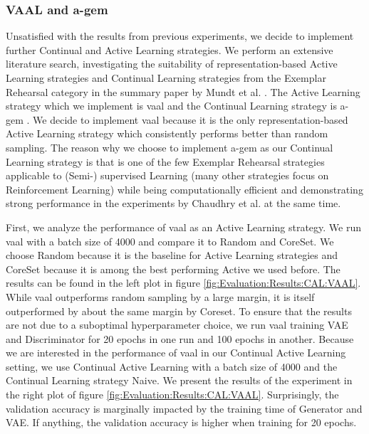 \subsubsection{VAAL and \gls{a-gem}}
\label{sec:Evaluation:Results:CAL:VAAL_AGEM}
Unsatisfied with the results from previous experiments, we decide to implement further Continual and Active Learning strategies. We perform an extensive literature search, investigating the suitability of representation-based Active Learning strategies and Continual Learning
strategies from the Exemplar Rehearsal category in the summary paper by Mundt et al. \cite{mundt2020wholistic}. The Active Learning strategy which we implement is \gls{vaal} \cite{sinha2019variational} and the Continual Learning strategy is \gls{a-gem} \cite{chaudhry2019continual}. We decide
to implement \gls{vaal} because it is the only representation-based Active Learning strategy which consistently performs better than random sampling. The reason why we choose to implement \gls{a-gem} as our Continual Learning strategy is that is one of the few Exemplar Rehearsal strategies
applicable to (Semi-) supervised Learning (many other strategies focus on Reinforcement Learning) while being computationally efficient and demonstrating strong performance in the experiments by Chaudhry et al. \cite{chaudhry2019continual} at the same time. \par
First, we analyze the performance of \gls{vaal} as an Active Learning strategy. We run \gls{vaal} with a batch size of 4000 and compare it to Random and CoreSet. We choose Random because it is the baseline for Active Learning strategies and CoreSet because it is among the best performing Active
we used before. The results can be found in the left plot in figure \ref{fig:Evaluation:Results:CAL:VAAL}. While \gls{vaal} outperforms random sampling by a large margin, it is itself outperformed by about the same margin by Coreset. To ensure that the results are not due to a
suboptimal hyperparameter choice, we run \gls{vaal} training VAE and Discriminator for 20 epochs in one run and 100 epochs in another. Because we are interested in the performance of \gls{vaal} in our Continual Active Learning setting, we use Continual Active Learning with a batch size of 4000
and the Continual Learning strategy Naive. We present the results of the experiment in the right plot of figure \ref{fig:Evaluation:Results:CAL:VAAL}. Surprisingly, the validation accuracy is marginally impacted by the training time of Generator and VAE. If anything, the validation
accuracy is higher when training for 20 epochs. \par

